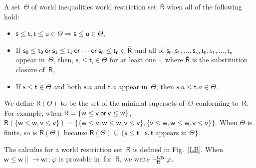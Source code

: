    A set~$\Theta$ of world inequalities
    world restriction set~$\mathsf R$ when all of the
   following hold:
   \begin{itemize}
    \item $\mathsf s\le \mathsf t, \mathsf t\le \mathsf u\in
	  \Theta\Longrightarrow
	  \mathsf s\le \mathsf u\in\Theta$,
    \item If $\mathsf{s_0}\le \mathsf{t_0} \mathbin{\mathsf{or}} \mathsf{s_1}\le \mathsf
	  {t_1}\mathbin{\mathsf{or}}
	  \cdots\mathbin{\mathsf{or}} \mathsf{s_n}\le
	  \mathsf{t_n}\in \bar{\mathsf R}$ and all of
	  $\mathsf{s_0},\mathsf{s_1},\ldots,\mathsf{s_n},
	  \mathsf{t_0},\mathsf{t_1},\ldots, \mathsf{t_n}$ appear in~$\Theta$, then,
	  $\mathsf{s_i}\le \mathsf{t_i}\in\Theta$ for at least
	  one~$\mathsf{i}$, where $\bar {\mathsf R}$ is the substitution
	  closure of~$\mathsf R$,
    \item If $\mathsf s\le\mathsf t\in\Theta$ and both $\mathsf s.a$ and
	  $\mathsf t.a$ appear in~$\Theta$, then $\mathsf s.a\le\mathsf
	  t.a\in \Theta$.
   \end{itemize}
   We define $\mathsf R(\Theta)$ to be the set of the minimal
   supersets of~$\Theta$ conforming to~$\mathsf R$.
   For example, when $\mathsf R=\{\mathsf w\le \mathsf v\mathbin{\mathsf{or}}\mathsf v\le \mathsf
   w\}$,
   $\mathsf R(\{\mathsf w\le \mathsf w, \mathsf v\le \mathsf v\}) =
   \{\{\mathsf w\le \mathsf v, \mathsf w\le \mathsf w, \mathsf v \le
   \mathsf v\}, \{\mathsf v \le
   \mathsf w, \mathsf w\le \mathsf w, \mathsf v\le \mathsf v\}\}$\enspace.
   When $\Theta$ is finite, so is $\mathsf R(\Theta)$ because $\mathsf
   R(\Theta)\subseteq \{\mathsf s\le\mathsf
   t\mid\mathsf s,\mathsf t\mbox{ appears in }\Theta\}$.

   \begin{definition}
    The calculus\,\LB\,for a world restriction set~$\mathsf R$ is defined in Fig.~\ref{LB}.
    When $\mathsf w\le \mathsf w\parallel \rightarrow \mathsf
    w::\varphi$ is provable in \LB\,for~$\mathsf R$,
    we write $\vdashRLB\varphi$.
   \end{definition}

